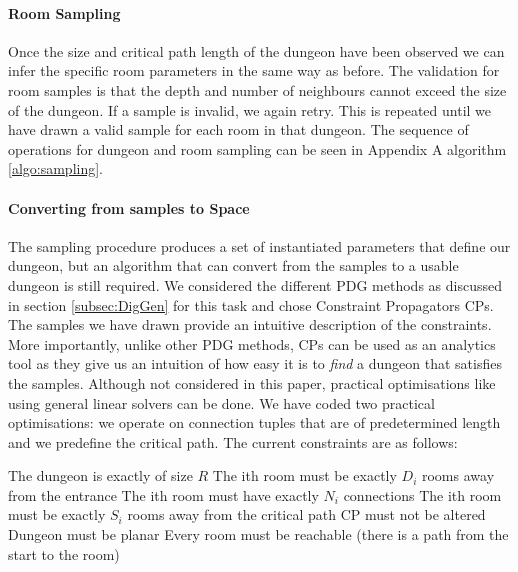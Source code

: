 \documentclass{UoYCSproject}
\begin{document}
\paragraph{Room Sampling}
Once the size and critical path length of the dungeon have been observed we can infer the specific room parameters in the same way as before. The validation for room samples is that the depth and number of neighbours cannot exceed the size of the dungeon. If a sample is invalid, we again retry. This is repeated until we have drawn a valid sample for each room in that dungeon. The sequence of operations for dungeon and room sampling can be seen in Appendix A algorithm \ref{algo:sampling}.

\paragraph{Converting from samples to Space}
The sampling procedure produces a set of instantiated parameters that define our dungeon, but an algorithm that can convert from the samples to a usable dungeon is still required. We considered the different PDG methods as discussed in section \ref{subsec:DigGen} for this task and chose Constraint Propagators CPs. The samples we have drawn provide an intuitive description of the constraints. More importantly, unlike other PDG methods, CPs can be used as an analytics tool as they give us an intuition of how easy it is to \textit{find} a dungeon that satisfies the samples. Although not considered in this paper, practical optimisations like using general linear solvers can be done. We have coded two practical optimisations: we operate on connection tuples that are of predetermined length and we predefine the critical path. The current constraints are as follows:
\begin{outline}[enumerate]
  \1 The dungeon is exactly of size \(R\)
  \1 The ith room must be exactly \(D_i\) rooms away from the entrance
  \1 The ith room must have exactly \(N_i\) connections 
  \1 The ith room must be exactly \(S_i\) rooms away from the critical path
  \1 CP must not be altered
  \1 Dungeon must be planar
  \1 Every room must be reachable (there is a path from the start to the room)
\end{outline}
\end{document}
